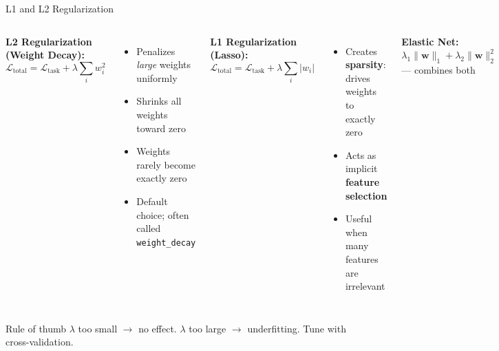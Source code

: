 \documentclass[aspectratio=169]{beamer}
\begin{document}
\begin{frame}{L1 and L2 Regularization}

\begin{columns}
\textbf{L2 Regularization (Weight Decay):}
\[
\mathcal{L}_{\text{total}} = \mathcal{L}_{\text{task}} + \lambda \sum_i w_i^2
\]
\begin{itemize}
    \item Penalizes \emph{large} weights uniformly
    \item Shrinks all weights toward zero
    \item Weights rarely become exactly zero
    \item Default choice; often called \texttt{weight\_decay}
\end{itemize}

\textbf{L1 Regularization (Lasso):}
\[
\mathcal{L}_{\text{total}} = \mathcal{L}_{\text{task}} + \lambda \sum_i |w_i|
\]
\begin{itemize}
    \item Creates \textbf{sparsity}: drives weights to exactly zero
    \item Acts as implicit \textbf{feature selection}
    \item Useful when many features are irrelevant
\end{itemize}

\vspace{0.2cm}
\textbf{Elastic Net:} $\lambda_1 \|\mathbf{w}\|_1 + \lambda_2 \|\mathbf{w}\|_2^2$ --- combines both
\end{columns}

\vspace{0.3cm}
\begin{block}{Rule of thumb}
$\lambda$ too small $\to$ no effect. \;$\lambda$ too large $\to$ underfitting. Tune with cross-validation.
\end{block}
\end{frame}
\end{document}
